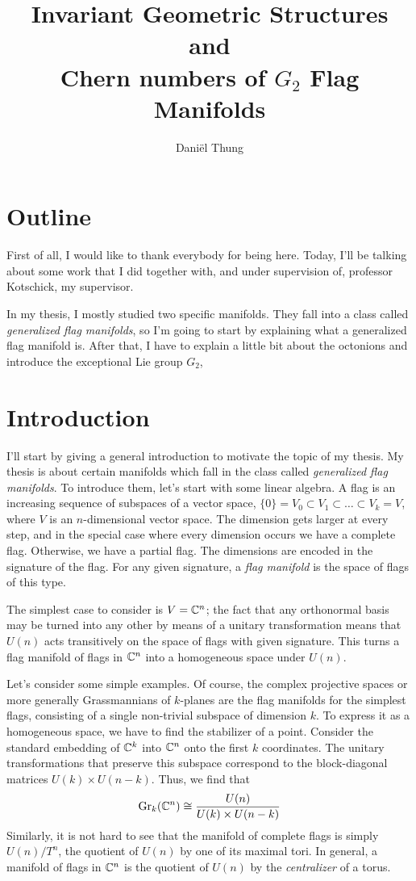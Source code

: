\documentclass[parskip=half]{scrartcl}
\title{Invariant Geometric Structures and \\ Chern numbers of  $G_2$ Flag Manifolds}
\author{Dani\"el Thung}
\date{}
\begin{document}
\maketitle

\section{Outline}

First of all, I would like to thank everybody for being here. Today, I'll be talking about some work that I did together with, and under supervision of, professor Kotschick, my supervisor.

In my thesis, I mostly studied two specific manifolds. They fall into a class called \emph{generalized flag manifolds}, so I'm going to start by explaining what a generalized flag manifold is. After that, I have to explain a little bit about the octonions and introduce the exceptional Lie group $G_2$, 

\section{Introduction}

I'll start by giving a general introduction to motivate the topic of my thesis. My thesis is about certain manifolds which fall in the class called \emph{generalized flag manifolds}. To introduce them, let's start with some linear algebra. A flag is an increasing sequence of subspaces of a vector space, $\{0\}=V_0\subset V_1\subset \dots \subset V_k=V$, where $V$ is an $n$-dimensional vector space. The dimension gets larger at every step, and in the special case where every dimension occurs we have a complete flag. Otherwise, we have a partial flag. The dimensions are encoded in the signature of the flag. For any given signature, a \emph{flag manifold} is the space of flags of this type.

The simplest case to consider is $V=\mathbb{C}^n$; the fact that any orthonormal basis may be turned into any other by means of a unitary transformation means that $U(n)$ acts transitively on the space of flags with given signature. This turns a flag manifold of flags in $\mathbb{C}^n$ into a homogeneous space under $U(n)$. 

Let's consider some simple examples. Of course, the complex projective spaces or more generally Grassmannians of $k$-planes are the flag manifolds for the simplest flags, consisting of a single non-trivial subspace of dimension $k$. To express it as a homogeneous space, we have to find the stabilizer of a point. Consider the standard embedding of $\mathbb{C}^k$ into $\mathbb{C}^n$ onto the first $k$ coordinates. The unitary transformations that preserve this subspace correspond to the block-diagonal matrices $U(k)\times U(n-k)$. Thus, we find that 
\begin{equation*}
	\operatorname{Gr}_k(\mathbb{C}^n)\cong \frac{U(n)}{U(k)\times U(n-k)}
\end{equation*}
Similarly, it is not hard to see that the manifold of complete flags is simply $U(n)/T^n$, the quotient of $U(n)$ by one of its maximal tori. In general, a manifold of flags in $\mathbb{C}^n$ is the quotient of $U(n)$ by the \emph{centralizer} of a torus. 
\end{document}
